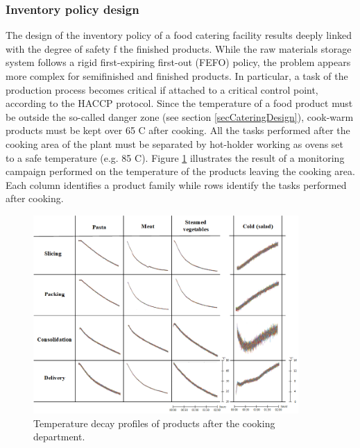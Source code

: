 \subsubsection{Inventory policy design}
The design of the inventory policy of a food catering facility results deeply linked with the degree of safety f the finished products. While the raw materials storage system follows a rigid first-expiring first-out (FEFO) policy, the problem appears more complex for semifinished and finished products. In particular, a task of the production process becomes critical if attached to a critical control point, according to the HACCP protocol. Since the temperature of a food product must be outside the so-called danger zone (see section \ref{secCateringDesign}), cook-warm products must be kept over 65 \degree C after cooking. All the tasks performed after the cooking area of the plant must be separated by hot-holder working as ovens set to a safe temperature (e.g. 85 \degree C). Figure \ref{fig_prod_CAMST_temperatureProfiles} illustrates the result of a monitoring campaign performed on the temperature of the products leaving the cooking area. Each column identifies a product family while rows identify the tasks performed after cooking.


\begin{figure}[hbt!]
\centering
\includegraphics[width=0.9\textwidth]{sectionProduction/design_process_figures/fig_prod_CAMST_temperatureProfiles.png}
\captionsetup{type=figure}
\caption{Temperature decay profiles of products after the cooking department.}
\label{fig_prod_CAMST_temperatureProfiles}
\end{figure}

